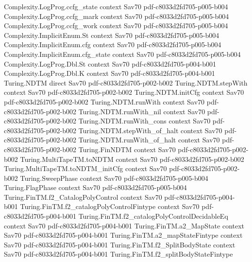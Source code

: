 \begin{theorem}
\proofstep
  {Complexity.LogProg.ccfg_state}
  {context}
  {Sav70}
  {pdf-c8033d2fd705-p005-b004}
\proofstep
  {Complexity.LogProg.ccfg_mark}
  {context}
  {Sav70}
  {pdf-c8033d2fd705-p005-b004}
\proofstep
  {Complexity.LogProg.ccfg_work}
  {context}
  {Sav70}
  {pdf-c8033d2fd705-p005-b004}
\proofstep
  {Complexity.ImplicitEnum.St}
  {context}
  {Sav70}
  {pdf-c8033d2fd705-p005-b004}
\proofstep
  {Complexity.ImplicitEnum.cfg}
  {context}
  {Sav70}
  {pdf-c8033d2fd705-p005-b004}
\proofstep
  {Complexity.ImplicitEnum.cfg_state}
  {context}
  {Sav70}
  {pdf-c8033d2fd705-p005-b004}
\proofstep
  {Complexity.LogProg.Dbl.St}
  {context}
  {Sav70}
  {pdf-c8033d2fd705-p004-b001}
\proofstep
  {Complexity.LogProg.Dbl.K}
  {context}
  {Sav70}
  {pdf-c8033d2fd705-p004-b001}
\proofstep
  {Turing.NDTM}
  {direct}
  {Sav70}
  {pdf-c8033d2fd705-p002-b002}
\proofstep
  {Turing.NDTM.stepWith}
  {context}
  {Sav70}
  {pdf-c8033d2fd705-p002-b002}
\proofstep
  {Turing.NDTM.initCfg}
  {context}
  {Sav70}
  {pdf-c8033d2fd705-p002-b002}
\proofstep
  {Turing.NDTM.runWith}
  {context}
  {Sav70}
  {pdf-c8033d2fd705-p002-b002}
\proofstep
  {Turing.NDTM.runWith_nil}
  {context}
  {Sav70}
  {pdf-c8033d2fd705-p002-b002}
\proofstep
  {Turing.NDTM.runWith_cons}
  {context}
  {Sav70}
  {pdf-c8033d2fd705-p002-b002}
\proofstep
  {Turing.NDTM.stepWith_of_halt}
  {context}
  {Sav70}
  {pdf-c8033d2fd705-p002-b002}
\proofstep
  {Turing.NDTM.runWith_of_halt}
  {context}
  {Sav70}
  {pdf-c8033d2fd705-p002-b002}
\proofstep
  {Turing.FinNDTM}
  {context}
  {Sav70}
  {pdf-c8033d2fd705-p002-b002}
\proofstep
  {Turing.MultiTapeTM.toNDTM}
  {context}
  {Sav70}
  {pdf-c8033d2fd705-p002-b002}
\proofstep
  {Turing.MultiTapeTM.toNDTM_initCfg}
  {context}
  {Sav70}
  {pdf-c8033d2fd705-p002-b002}
\proofstep
  {Turing.SweepPhase}
  {context}
  {Sav70}
  {pdf-c8033d2fd705-p005-b004}
\proofstep
  {Turing.FlagPhase}
  {context}
  {Sav70}
  {pdf-c8033d2fd705-p005-b004}
\proofstep
  {Turing.FinTM.f2_CatalogPolyControl}
  {context}
  {Sav70}
  {pdf-c8033d2fd705-p004-b001}
\proofstep
  {Turing.FinTM.f2_catalogPolyControlFintype}
  {context}
  {Sav70}
  {pdf-c8033d2fd705-p004-b001}
\proofstep
  {Turing.FinTM.f2_catalogPolyControlDecidableEq}
  {context}
  {Sav70}
  {pdf-c8033d2fd705-p004-b001}
\proofstep
  {Turing.FinTM.a2_MapState}
  {context}
  {Sav70}
  {pdf-c8033d2fd705-p004-b001}
\proofstep
  {Turing.FinTM.a2_mapStateFintype}
  {context}
  {Sav70}
  {pdf-c8033d2fd705-p004-b001}
\proofstep
  {Turing.FinTM.f2_SplitBodyState}
  {context}
  {Sav70}
  {pdf-c8033d2fd705-p004-b001}
\proofstep
  {Turing.FinTM.f2_splitBodyStateFintype}

\end{theorem}
